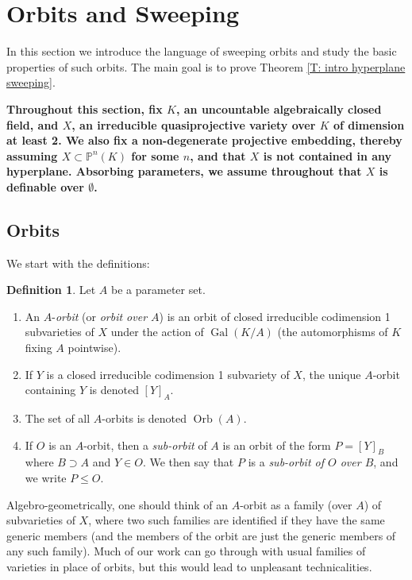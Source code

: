 \documentclass{amsart}
\theoremstyle{definition}
\newtheorem{definition}[theorem]{Definition}
\begin{document}
\section{Orbits and Sweeping}

In this section we introduce the language of sweeping orbits and study the basic properties of such orbits. The main goal is to prove Theorem \ref{T: intro hyperplane sweeping}.

\textbf{Throughout this section, fix $K$, an uncountable algebraically closed field, and $X$, an irreducible quasiprojective variety over $K$ of dimension at least 2. We also fix a non-degenerate projective embedding, thereby assuming $X\subset\mathbb P^n(K)$ for some $n$, and that $X$ is not contained in any hyperplane. Absorbing parameters, we assume throughout that $X$ is definable over $\emptyset$.}

\subsection{Orbits}

We start with the definitions:

\begin{definition}
    Let $A$ be a parameter set.
    \begin{enumerate}
        \item An $A$-\textit{orbit} (or \textit{orbit over $A$}) is an orbit of closed irreducible codimension 1 subvarieties of $X$ under the action of $\operatorname{Gal}(K/A)$ (the automorphisms of $K$ fixing $A$ pointwise).
        \item If $Y$ is a closed irreducible codimension 1 subvariety of $X$, the unique $A$-orbit containing $Y$ is denoted $[Y]_A$.
        \item The set of all $A$-orbits is denoted $\operatorname{Orb}(A)$.
        \item If $O$ is an $A$-orbit, then a \textit{sub-orbit} of $A$ is an orbit of the form $P=[Y]_B$ where $B\supset A$ and $Y\in O$. We then say that $P$ is a \textit{sub-orbit of $O$ over $B$}, and we write $P\leq O$.
    \end{enumerate}
\end{definition}

Algebro-geometrically, one should think of an $A$-orbit as a family (over $A$) of subvarieties of $X$, where two such families are identified if they have the same generic members (and the members of the orbit are just the generic members of any such family). Much of our work can go through with usual families of varieties in place of orbits, but this would lead to unpleasant technicalities.
\end{document}
